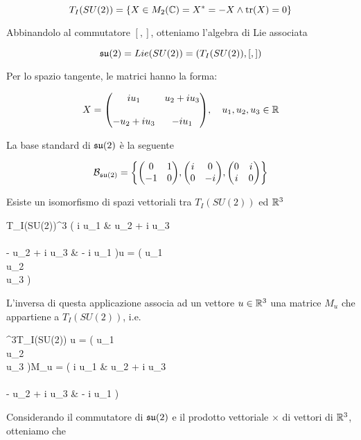 \begin{equation}
	T_{I}(SU(2)) = \{X \in M_{2}(\mathbb{C}) = X^{*} = -X \wedge \tr(X) = 0 \}
\end{equation}

Abbinandolo al commutatore $ [,] $, otteniamo l'algebra di Lie associata

\begin{equation}
	\mathfrak{su}(2) = Lie(SU(2)) = (T_{I}(SU(2)),[,])
\end{equation}

Per lo spazio tangente, le matrici hanno la forma:

\begin{equation}
	X = \mqty( i u_{1} & u_{2} + i u_{3} \\\\ - u_{2} + i u_{3} & - i u_{1} ) \qcomma u_{1},u_{2},u_{3} \in \R
\end{equation}

La base standard di $ \mathfrak{su}(2) $ è la seguente

\begin{equation}
	\mathcal{B}_{\su(2)} = \left\{ %
		\mqty( 0 & 1 \\ -1 & 0 ), %
		\mqty( i & 0 \\ 0 & -i ), %
		\mqty( 0 & i \\ i & 0 ) %
		\right\}
\end{equation}

Esiste un isomorfismo di spazi vettoriali tra $ T_{I}(SU(2)) $ ed $ \mathbb{R}^{3} $

\map{\psi}%
	{T_{I}(SU(2))}{\R^{3}}%
	{\mqty( i u_{1} & u_{2} + i u_{3} \\\\ - u_{2} + i u_{3} & - i u_{1} )}{u = \mqty( u_{1} \\ u_{2} \\ u_{3} )}

L'inversa di questa applicazione associa ad un vettore $ u \in \mathbb{R}^{3} $ una matrice $ M_{u} $ che appartiene a $ T_{I}(SU(2)) $, i.e.

%
	{\R^{3}}{T_{I}(SU(2))}%
	{u = \mqty( u_{1} \\ u_{2} \\ u_{3} )}{M_{u} = \mqty( i u_{1} & u_{2} + i u_{3} \\\\ - u_{2} + i u_{3} & - i u_{1} )}

Considerando il commutatore di $ \mathfrak{su}(2) $ e il prodotto vettoriale $ \times $ di vettori di $ \mathbb{R}^{3} $, otteniamo che

